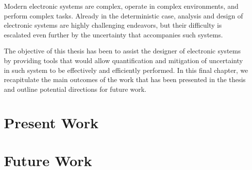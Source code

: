 Modern electronic systems are complex, operate in complex environments, and
perform complex tasks. Already in the deterministic case, analysis and design of
electronic systems are highly challenging endeavors, but their difficulty is
escalated even further by the uncertainty that accompanies such systems.

The objective of this thesis has been to assist the designer of electronic
systems by providing tools that would allow quantification and mitigation of
uncertainty in such system to be effectively and efficiently performed. In this
final chapter, we recapitulate the main outcomes of the work that has been
presented in the thesis and outline potential directions for future work.

\section{Present Work}

\section{Future Work}
